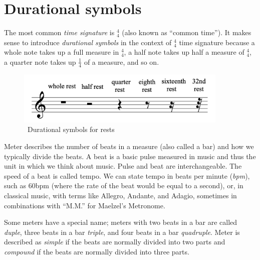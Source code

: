 \section{Durational symbols}\label{sec:durational-symbols}

The most common \textit{time signature} is $_{4}^{4}$ (also known as ``common time'').
It makes sense to introduce \textit{durational symbols} in the context of $_{4}^{4}$ time signature because a whole note takes up a full measure in $_{4}^{4}$, a half note takes up half a measure of $_{4}^{4}$, a quarter note takes up $\frac{1}{4}$ of a measure, and so on.


\begin{figure}
    \centering
    \includegraphics[width=0.9\textwidth]{assets/durational-symbols}
    \caption{~Durational symbols for rests~\cite{music-theory}}\label{fig:durational-symbols}
\end{figure}

Meter describes the number of beats in a measure (also called a bar) and how we typically divide the beats.
A beat is a basic pulse measured in music and thus the unit in which we think about music.
Pulse and beat are interchangeable.
The speed of a beat is called tempo.
We can state tempo in beats per minute (\textit{bpm}), such as 60bpm (where the rate of the beat would be equal to a second), or, in classical music, with terms like Allegro, Andante, and Adagio, sometimes in combinations with ``M.M.'' for Maelzel's Metronome.~\cite{music-theory}

Some meters have a special name;
meters with two beats in a bar are called \textit{duple}, three beats in a bar \textit{triple}, and four beats in a bar \textit{quadruple}.
Meter is described as \textit{simple} if the beats are normally divided into two parts and \textit{compound} if the beats are normally divided into three parts.~\cite{music-theory}

